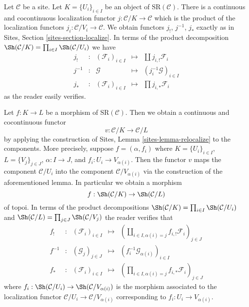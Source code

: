 \medskip\noindent
Let $\mathcal{C}$ be a site. Let $K = \{U_i\}_{i \in I}$ be an object of
$\text{SR}(\mathcal{C})$. There is a continuous and cocontinuous
localization functor $j : \mathcal{C}/K \to \mathcal{C}$ which is
the product of the localization functors
$j_i : \mathcal{C}/V_i \to \mathcal{C}$.
We obtain functors $j_!$, $j^{-1}$, $j_*$ exactly
as in Sites, Section \ref{sites-section-localize}.
In terms of the product decomposition
$\Sh(\mathcal{C}/K) = \prod\nolimits_{i \in I} \Sh(\mathcal{C}/U_i)$
we have
$$
\begin{matrix}
j_! & : &
(\mathcal{F}_i)_{i \in I} &
\longmapsto &
\coprod j_{i, !}\mathcal{F}_i \\
j^{-1} & : &
\mathcal{G} &
\longmapsto &
(j_i^{-1}\mathcal{G})_{i \in I} \\
j_* & : &
(\mathcal{F}_i)_{i \in I} &
\longmapsto &
\prod j_{i, *}\mathcal{F}_i
\end{matrix}
$$
as the reader easily verifies.

\medskip\noindent
Let $f : K \to L$ be a morphism of $\text{SR}(\mathcal{C})$.
Then we obtain a continuous and cocontinuous functor
$$
v : \mathcal{C}/K \longrightarrow \mathcal{C}/L
$$
by applying the construction of Sites, Lemma \ref{sites-lemma-relocalize}
to the components. More precisely, suppose $f = (\alpha, f_i)$
where $K = \{U_i\}_{i \in I}$, $L = \{V_j\}_{j \in J}$, $\alpha : I \to J$,
and $f_i : U_i \to V_{\alpha(i)}$. Then the functor $v$ maps the component
$\mathcal{C}/U_i$ into the component $\mathcal{C}/V_{\alpha(i)}$
via the construction of the aforementioned lemma. In particular
we obtain a morphism
$$
f : \Sh(\mathcal{C}/K) \to \Sh(\mathcal{C}/L)
$$
of topoi. In terms of the product decompositions
$\Sh(\mathcal{C}/K) = \prod\nolimits_{i \in I} \Sh(\mathcal{C}/U_i)$ and
$\Sh(\mathcal{C}/L) = \prod\nolimits_{j \in J} \Sh(\mathcal{C}/V_j)$
the reader verifies that
$$
\begin{matrix}
f_! & : &
(\mathcal{F}_i)_{i \in I} &
\longmapsto &
(\coprod\nolimits_{i \in I, \alpha(i) = j} f_{i, !}\mathcal{F}_i)_{j \in J} \\
f^{-1} & : &
(\mathcal{G}_j)_{j \in J} &
\longmapsto &
(f_i^{-1}\mathcal{G}_{\alpha(i)})_{i \in I} \\
f_* & : &
(\mathcal{F}_i)_{i \in I} &
\longmapsto &
(\prod\nolimits_{i \in I, \alpha(i) = j} f_{i, *}\mathcal{F}_i)_{j \in J}
\end{matrix}
$$
where $f_i : \Sh(\mathcal{C}/U_i) \to \Sh(\mathcal{C}/V_{\alpha(i)})$
is the morphism associated to the localization functor
$\mathcal{C}/U_i \to \mathcal{C}/V_{\alpha(i)}$ corresponding to
$f_i : U_i \to V_{\alpha(i)}$.

